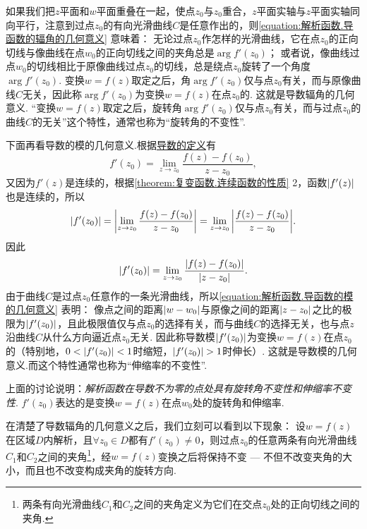如果我们把\(z\)平面和\(w\)平面重叠在一起，使点\(z_0\)与\(z_0\)重合，\(z\)平面实轴与\(z\)平面实轴同向平行，注意到过点\(z_0\)的有向光滑曲线\(C\)是任意作出的，则\cref{equation:解析函数.导函数的辐角的几何意义} 意味着：
无论过点\(z_0\)作怎样的光滑曲线，它在点\(z_0\)的正向切线与像曲线在点\(w_0\)的正向切线之间的夹角总是\(\arg f'(z_0)\)；
或者说，像曲线过点\(w_0\)的切线相比于原像曲线过点\(z_0\)的切线，总是绕点\(z_0\)旋转了一个角度\(\arg f'(z_0)\).
变换\(w = f(z)\)取定之后，角\(\arg f'(z_0)\)仅与点\(z_0\)有关，而与原像曲线\(C\)无关，因此称\(\arg f'(z_0)\)为变换\(w = f(z)\)在点\(z_0\)的.
这就是导数辐角的几何意义.
“变换\(w = f(z)\)取定之后，旋转角\(\arg f'(z_0)\)仅与点\(z_0\)有关，而与过点\(z_0\)的曲线\(C\)的无关”这个特性，通常也称为“旋转角的不变性”.

下面再看导数的模的几何意义.根据\hyperref[equation:解析函数.导数的定义式]{导数的定义}有\begin{equation*}
f'(z_0) = \lim_{z \to z_0} \frac{f(z) - f(z_0)}{z - z_0},
\end{equation*}又因为\(f'(z)\)是连续的，根据\cref{theorem:复变函数.连续函数的性质}  2，函数\(\abs{f'(z)}\)也是连续的，所以\begin{equation*}
\abs{f'(z_0)}
= \abs{ \lim_{z \to z_0} \frac{f(z) - f(z_0)}{z - z_0} }
= \lim_{z \to z_0} \abs{ \frac{f(z) - f(z_0)}{z - z_0} }.
\end{equation*}因此\begin{equation}\label{equation:解析函数.导函数的模的几何意义}
\abs{f'(z_0)}
= \lim_{z \to z_0} \frac{\abs{f(z) - f(z_0)}}{\abs{z - z_0}}.
\end{equation}
由于曲线\(C\)是过点\(z_0\)任意作的一条光滑曲线，所以\cref{equation:解析函数.导函数的模的几何意义} 表明：
像点之间的距离\(\abs{w - w_0}\)与原像之间的距离\(\abs{z - z_0}\)之比的极限为\(\abs{f'(z_0)}\)，且此极限值仅与点\(z_0\)的选择有关，而与曲线\(C\)的选择无关，也与点\(z\)沿曲线\(C\)从什么方向逼近点\(z_0\)无关.
因此称导数模\(\abs{f'(z_0)}\)为变换\(w = f(z)\)在点\(z_0\)的（特别地，\(0 < \abs{f'(z_0)} < 1\)时缩短，\(\abs{f'(z_0)} > 1\)时伸长）.
这就是导数模的几何意义.而这个特性通常也称为“伸缩率的不变性”.

上面的讨论说明：\emph{解析函数在导数不为零的点处具有旋转角不变性和伸缩率不变性}.
\(f'(z_0)\)表达的是变换\(w = f(z)\)在点\(w_0\)处的旋转角和伸缩率.

在清楚了导数辐角的几何意义之后，我们立刻可以看到以下现象：
设\(w = f(z)\)在区域\(D\)内解析，且\(\forall z_0 \in D\)都有\(f'(z_0) \neq 0\)，则过点\(z_0\)的任意两条有向光滑曲线\(C_1\)和\(C_2\)之间的夹角\footnote{两条有向光滑曲线\(C_1\)和\(C_2\)之间的夹角定义为它们在交点\(z_0\)处的正向切线之间的夹角.}，经\(w = f(z)\)变换之后将保持不变 --- 不但不改变夹角的大小，而且也不改变构成夹角的旋转方向.

